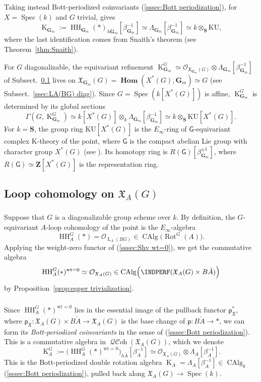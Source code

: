 \documentclass[12pt, oneside]{amsart}
\numberwithin{equation}{section}
\theoremstyle{remark}
\theoremstyle{plain}
\DeclareMathOperator{\QCOH}{\mathcal{QC}\textit{oh}}
\DeclareMathOperator{\HOM}{\mathbf{Hom}}
\newcommand{\frX}{\mathfrak{X}}
\newcommand{\lam}{\Lambda}
\newcommand{\Loop}{\operatorname{L}}
\newcommand{\OO}{\mathcal{O}}
\DeclareMathOperator{\spc}{Spec}
\newcommand{\GG}{\mathbf{G}}
\newcommand{\GGm}{\mathbf{G}_{m}}
\newcommand{\bZ}{\mathbf{Z}}
\newcommand{\CAlg}{\operatorname{CAlg}}
\newcommand{\HH}{\operatorname{HH}}
\newcommand{\K}{\operatorname{K}}
\newcommand{\sfp}{\mathsf{p}}
\newcommand{\Rot}{\operatorname{Rot}}
\begin{document}
Taking instead Bott-periodized coinvariants (\ref{sssec:Bott periodization}), for $X = \spc(k)$ and $G$ trivial, gives
\[
  \K_{\GGm} :=
    \HH_{\GGm}(*)_{h\check{\GG}_m}[\beta_{\GGm}^{-1}]
    \simeq \lam_{\GGm}[\beta_{\GGm}^{-1}]
    \simeq k \otimes_{\mathbf{S}} \mathrm{KU},
\]
where the last identification comes from Snaith's theorem (see Theorem~\ref{thm:Snaith}).

For $G$ diagonalizable, the equivariant refinement $\K_{\GGm}^G \simeq \OO_{\frX_{\GGm}(G)} \otimes \lam_{\GGm}[\beta_{\GGm}^{-1}]$ of Subsect.~\ref{ssec:HH on XAG} lives on $\frX_{\GGm}(G) = \HOM(X^*(G), \GGm) \simeq G$ (see Subsect.~\ref{ssec:LA(BG) diag}).
Since $G = \spc(k[X^*(G)])$ is affine, $\K_{\GGm}^G$ is determined by its global sections
\[
  \Gamma(G, \K_{\GGm}^G)
  \simeq k[X^*(G)] \otimes_k \lam_{\GGm}[\beta_{\GGm}^{-1}]
  \simeq k \otimes_{\mathbf{S}} \mathrm{KU}[X^*(G)].
\]
For $k = \mathbf{S}$, the group ring $\mathrm{KU}[X^*(G)]$ is the $E_\infty$-ring of $\mathsf{G}$-equivariant complex K-theory of the point, where $\mathsf{G}$ is the compact abelian Lie group with character group $X^*(G)$ (see \cite[\S 4]{GepMei}). Its homotopy ring is $R(\mathsf{G})[\beta_{\GGm}^{\pm 1}]$, where $R(\mathsf{G}) \simeq \bZ[X^*(G)]$ is the representation ring.

\subsection{Loop cohomology on $\frX_A(G)$}
\label{ssec:HH on XAG}

\subsubsection{}

Suppose that $G$ is a diagonalizable group scheme over $k$.
By definition, the $G$-equivariant $A$-loop cohomology of the point is the $E_\infty$-algebra
\[
  \HH_A^G(\ast)
  =
  \OO_{\Loop_A(BG)}
  \in
  \CAlg\bigl(\Rot^G(A)\bigr).
\]
Applying the weight-zero functor of (\ref{sssec:Shv wt=0}), we get the commutative algebra
\[
  \HH_A^G(\ast)^{\mathrm{wt}=0} \simeq
  \OO_{\frX_A(G)}
  \in \CAlg\Bigl( \INDPERF(\frX_A(G) \times B\check{A}) \Bigr)
\]
by Proposition~\ref{prop:eqper trivialization}.

\subsubsection{}

Since $\HH_A^G(\ast)^{\mathrm{wt}=0}$ lies in the essential image of the pullback functor $\mathsf{p}_{\frX}^*$, where $\mathsf{p}_{\frX} : \frX_A(G) \times B\check{A} \to \frX_A(G)$ is the base change of $\sfp : B\check{A} \to *$, we can form its \emph{Bott-periodized coinvariants} in the sense of (\ref{sssec:Bott periodization}).
This is a commutative algebra in $\QCOH(\frX_A(G))$, which we denote
\[
  \K_A^G :=
  \bigl(\HH_A^G(\ast)^{\mathrm{wt}=0}\bigr)_{h\check{A}}[\beta_A^{-1}]
  \simeq \OO_{\frX_A(G)} \otimes \lam_A[\beta_A^{-1}].
\]
This is the Bott-periodized double rotation algebra $\K_A = \lam_A[\beta_A^{-1}] \in \CAlg_k$ (\ref{sssec:Bott periodization}), pulled back along $\frX_A(G) \to \spc(k)$.
\end{document}
